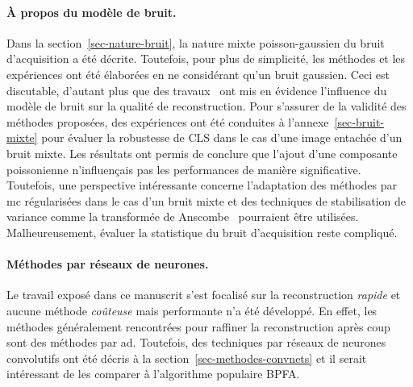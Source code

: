 \paragraph{\`A propos du modèle de bruit.} Dans la section~\ref{sec-nature-bruit}, la nature mixte poisson-gaussien du bruit d'acquisition a été décrite. Toutefois, pour plus de simplicité, les méthodes et les expériences ont été élaborées en ne considérant qu'un bruit gaussien. Ceci est discutable, d'autant plus que des travaux~\cite{sanders2018inpainting} ont mis en évidence l'influence du modèle de bruit sur la qualité de reconstruction. Pour s'assurer de la validité des méthodes proposées, des expériences ont été conduites à l'annexe~\ref{sec-bruit-mixte} pour évaluer la robustesse de CLS dans le cas d'une image entachée d'un bruit mixte. Les résultats ont permis de conclure que l'ajout d'une composante poissonienne n'influençais pas les performances de manière significative. Toutefois, une perspective intéressante concerne l'adaptation des méthodes par \gls{mc} régularisées dans le cas d'un bruit mixte et des techniques de stabilisation de variance comme la transformée de Anscombe~\cite{anscombe1948transformation} pourraient être utilisées. Malheureusement, évaluer la statistique du bruit d'acquisition reste compliqué.


\paragraph{Méthodes par réseaux de neurones.} Le travail exposé dans ce manuscrit s'est focalisé sur la reconstruction \emph{rapide} et aucune méthode \emph{coûteuse} mais performante n'a été développé. En effet, les méthodes généralement rencontrées pour raffiner la reconstruction après coup sont des méthodes par \gls{ad}. Toutefois, des techniques par réseaux de neurones convolutifs ont été décris à la section~\ref{sec-methodes-convnets} et il serait intéressant de les comparer à l'algorithme populaire BPFA.






